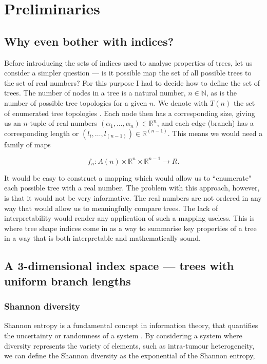 \section{Preliminaries}

\subsection{Why even bother with indices?}
Before introducing the sets of indices used to analyse properties of trees, let
us consider a simpler question --- is it possible map the set of all possible
trees to the set of real numbers? For this purpose I had to decide how to
define the set of trees. The number of nodes in a tree is a natural number,
$n\in\mathbb{N}$, as is the number of possible tree topologies for a given $n$.
We denote with $T(n)$ the set of enumerated tree topologies
\cite{nakano_tree_2016}. Each node then has a corresponding size, giving us an
$n$-tuple of real numbers $(\alpha_1, \dots, \alpha_n)\in\mathbb{R}^n$, and
each edge (branch) has a corresponding length or $(l_i, \dots,
l_{(n-1)})\in\mathbb{R}^{(n-1)}$. This means we would need a family of maps

\begin{equation}
    f_n: A(n) \times \mathbb{R}^n \times \mathbb{R}^{n-1} \rightarrow R.
\end{equation}

It would be easy to construct a mapping which would allow us to ``enumerate"
each possible tree with a real number. The problem with this approach, however,
is that it would not be very informative. The real numbers are not ordered in
any way that would allow us to meaningfully compare trees. The lack of
interpretability would render any application of such a mapping useless. This is
where tree shape indices come in as a way to summarise key properties of a tree
in a way that is both interpretable and mathematically sound.

\subsection{A 3-dimensional index space --- trees with uniform branch lengths}

\subsubsection{Shannon diversity}
Shannon entropy is a fundamental concept in information theory, that quantifies
the uncertainty or randomness of a system \cite{shannon_mathematical_1948}. By
considering a system where diversity represents the variety of elements, such as
intra-tumour heterogeneity, we can define the Shannon diversity as the
exponential of the Shannon entropy,

